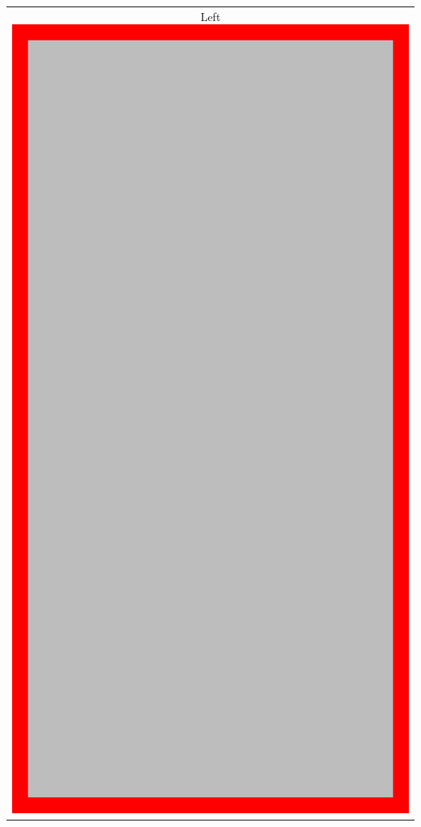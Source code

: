 \documentclass{article}
\newlength{\leftcolwidth}
\newlength{\rightcolwidth}
\begin{document}
\pagestyle{empty}

\setlength{\leftcolwidth}{106mm}           %
\setlength{\rightcolwidth}{\paperwidth}
\addtolength\rightcolwidth{-\leftcolwidth} %





\pagestyle{empty}%
    \noindent
    \begin{tabular}{@{}c@{}}
    \cellcolor{blue!50}%
    \begin{minipage}[t][\paperheight][t]{106mm}%
        Left
        \includegraphics[width=\linewidth]{col_left} 

\end{minipage}
\end{tabular}
\end{document}
